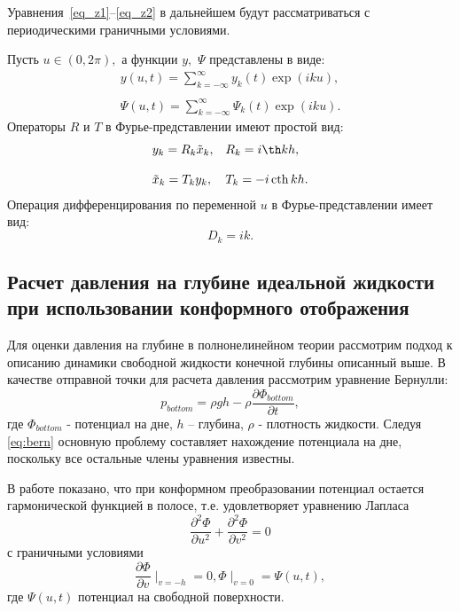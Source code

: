Уравнения~\eqref{eq_z1}--\eqref{eq_z2} в дальнейшем будут рассматриваться с
периодическими граничными условиями.

Пусть $u\in(0,2\pi),$ а функции $y,$ $\Psi$ представлены в виде:
\begin{gather*}\label{eq_kn}
y(u,t)=\sum\limits_{k=-\infty}^{\infty}y_k(t)\exp(iku),
\\
\\
\Psi(u,t)=\sum\limits_{k=-\infty}^{\infty}\Psi_k(t)\exp(iku).
\end{gather*}
Операторы $R$ и $T$ в Фурье-представлении имеют простой вид:
$$
\begin{array}{ll}
y_k=R_k \tilde x_k, & R_k=i\th kh, \\
\\
\tilde x_k=T_ky_k, & T_k=-i\operatorname{cth}kh. \\
\end{array}
$$
Операция дифференцирования по переменной $u$ в Фурье-представлении
имеет вид:
$$
D_k=ik.
$$
\subsection{Расчет давления на глубине идеальной жидкости при использовании конформного отображения}

Для оценки давления на глубине в полнонелинейном теории рассмотрим подход к описанию динамики свободной жидкости конечной глубины описанный выше. В качестве отправной точки для расчета давления рассмотрим уравнение Бернулли:
\begin{equation}\label{eq:bern}
p_{bottom}=\rho gh-\rho \frac{\partial\Phi_{bottom}}{\partial t},
\end{equation}
где  $\Phi_{bottom}$ - потенциал на дне, $h$ – глубина, $\rho$ - плотность жидкости. Следуя \eqref{eq:bern} основную проблему составляет нахождение потенциала на дне, поскольку все остальные члены уравнения известны.

В работе \cite{DiachZK1996} показано, что при конформном преобразовании потенциал   остается гармонической функцией в полосе, т.е. удовлетворяет уравнению Лапласа
\begin{equation}\label{eq:laplas}
\frac{\partial^2\Phi}{\partial u^2}+\frac{\partial^2\Phi}{\partial v^2} = 0
\end{equation}
с граничными условиями
\begin{equation}\label{eq:laplasGranUsl}
\frac{\partial\Phi}{\partial v}\mid_{v=-h}=0, \Phi\mid_{v=0}=\Psi(u,t),
\end{equation}
где $\Psi(u,t)$ потенциал на свободной поверхности.


